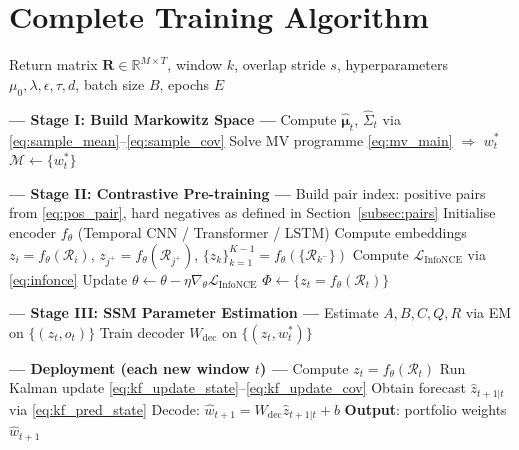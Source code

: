 \documentclass[12pt, a4paper]{report}
\theoremstyle{plain}
\theoremstyle{definition}
\newcommand{\R}{\mathbb{R}}
\newcommand{\calM}{\mathcal{M}}
\newcommand{\calR}{\mathcal{R}}
\newcommand{\bmu}{\bm{\mu}}
\begin{document}
\section{Complete Training Algorithm}
\label{sec:algorithm}

\begin{algorithm}[H]
\caption{$\Phi$-Space: Training and Deployment}
\label{alg:phi_space}
\begin{algorithmic}[1]
\Require Return matrix $\mathbf{R} \in \R^{M \times T}$, window $k$,
         overlap stride $s$, hyperparameters
         $\mu_0, \lambda, \epsilon, \tau, d$, batch size $B$, epochs $E$

\Statex \textbf{--- Stage I: Build Markowitz Space ---}
  \State Compute $\hat{\bmu}_t$, $\hat{\Sigma}_t$ via \eqref{eq:sample_mean}--\eqref{eq:sample_cov}
  \State Solve MV programme \eqref{eq:mv_main} $\Rightarrow$ $w_t^*$
\EndFor
\State $\calM \leftarrow \{w_t^*\}$

\Statex \textbf{--- Stage II: Contrastive Pre-training ---}
\State Build pair index: positive pairs from \eqref{eq:pos_pair},
       hard negatives as defined in Section~\ref{subsec:pairs}
\State Initialise encoder $f_\theta$ (Temporal CNN / Transformer / LSTM)
    \State Compute embeddings $z_i = f_\theta(\calR_i)$,
           $z_{j^+} = f_\theta(\calR_{j^+})$,
           $\{z_k\}_{k=1}^{K-1} = f_\theta(\{\calR_{k^-}\})$
    \State Compute $\mathcal{L}_{\text{InfoNCE}}$ via \eqref{eq:infonce}
    \State Update $\theta \leftarrow \theta - \eta \nabla_\theta
           \mathcal{L}_{\text{InfoNCE}}$
  \EndFor
\EndFor
\State $\Phi \leftarrow \{z_t = f_\theta(\calR_t)\}$

\Statex \textbf{--- Stage III: SSM Parameter Estimation ---}
\State Estimate $A, B, C, Q, R$ via EM on $\{(z_t, o_t)\}$
\State Train decoder $W_{\text{dec}}$ on $\{(z_t, w_t^*)\}$

\Statex \textbf{--- Deployment (each new window $t$) ---}
\State Compute $z_t = f_\theta(\calR_t)$
\State Run Kalman update \eqref{eq:kf_update_state}--\eqref{eq:kf_update_cov}
\State Obtain forecast $\hat{z}_{t+1|t}$ via \eqref{eq:kf_pred_state}
\State Decode: $\hat{w}_{t+1} = W_{\text{dec}}\hat{z}_{t+1|t} + b$
\State \textbf{Output}: portfolio weights $\hat{w}_{t+1}$
\end{algorithmic}
\end{algorithm}
\end{document}
